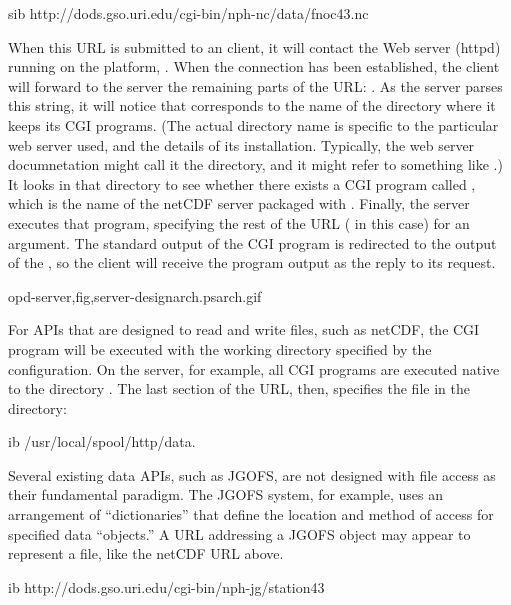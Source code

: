 \begin{vcode}{sib}
http://dods.gso.uri.edu/cgi-bin/nph-nc/data/fnoc43.nc
\end{vcode}

When this URL is submitted to an \opendap client, it will contact the Web
server (httpd) running on the platform, . When
the connection has been established, the client will forward to the
server the remaining parts of the URL:
. As the server parses this
string, it will notice that  corresponds to the name of
the directory where it keeps its CGI programs. (The actual directory
name is specific to the particular web server used, and the details of
its installation.  Typically, the web server documnetation might call
it the  directory, and it might refer to something
like .) It looks in that directory
to see whether there exists a CGI program called , which
is the name of the netCDF \opendap server packaged with \opendap.  Finally,
the server executes that program, specifying the rest of the URL
( in this case) for an argument.  The standard
output of the CGI program is redirected to the output of the
, so the client will receive the program output as the
reply to its request.

{opd-server,fig,server-design}{arch.ps}{arch.gif}{}

For APIs that are designed to read and write files, such as netCDF,
the CGI program will be executed with the working directory specified
by the  configuration. On the 
server, for example, all CGI programs are executed native to the
directory . The last section of the URL,
then, specifies the file  in the directory:

\begin{vcode}{ib}
/usr/local/spool/http/data.
\end{vcode}

Several existing data APIs, such as JGOFS, are not designed with file
access as their fundamental paradigm. The JGOFS system, for example,
uses an arrangement of ``dictionaries'' that define the location and
method of access for specified data ``objects.'' A URL addressing a
JGOFS object may appear to represent a file, like the netCDF URL
above. 

\begin{vcode}{ib}
http://dods.gso.uri.edu/cgi-bin/nph-jg/station43
\end{vcode}

